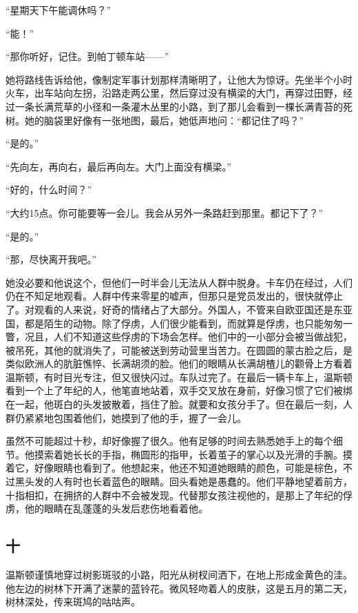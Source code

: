 ``星期天下午能调休吗？''

``能！''

``那你听好，记住。到帕丁顿车站------''

她将路线告诉给他，像制定军事计划那样清晰明了，让他大为惊讶。先坐半个小时火车，出车站向左拐，沿路走两公里，然后穿过没有横梁的大门，再穿过田野，经过一条长满荒草的小径和一条灌木丛里的小路，到了那儿会看到一棵长满青苔的死树。她的脑袋里好像有一张地图，最后，她低声地问：``都记住了吗？''

``是的。''

``先向左，再向右，最后再向左。大门上面没有横梁。''

``好的，什么时间？''

``大约15点。你可能要等一会儿。我会从另外一条路赶到那里。都记下了？''

``是的。''

``那，尽快离开我吧。''

她没必要和他说这个，但他们一时半会儿无法从人群中脱身。卡车仍在经过，人们仍在不知足地观看。人群中传来零星的嘘声，但那只是党员发出的，很快就停止了。对观看的人来说，好奇的情绪占了大部分。外国人，不管来自欧亚国还是东亚国，都是陌生的动物。除了俘虏，人们很少能看到，而就算是俘虏，也只能匆匆一瞥，况且，人们不知道这些俘虏的下场会怎样。他们中的一小部分会被当做战犯，被吊死，其他的就消失了，可能被送到劳动营里当苦力。在圆圆的蒙古脸之后，是类似欧洲人的肮脏憔悴、长满胡须的脸。他们的眼睛从长满胡楂儿的颧骨上方看着温斯顿，有时目光专注，但又很快闪过。车队过完了。在最后一辆卡车上，温斯顿看到一个上了年纪的人，他笔直地站着，双手交叉放在身前，好像习惯了它们被绑在一起，他斑白的头发披散着，挡住了脸。就要和女孩分手了。但在最后一刻，人群仍紧紧地包围着他们，她摸到了他的手，握了一会儿。

虽然不可能超过十秒，却好像握了很久。他有足够的时间去熟悉她手上的每个细节。他摸索着她长长的手指，椭圆形的指甲，长着茧子的掌心以及光滑的手腕。摸着它，好像眼睛也看到了。他想起来，他还不知道她眼睛的颜色，可能是棕色，不过黑头发的人有时也长着蓝色的眼睛。回头看她是愚蠢的。他们平静地望着前方，十指相扣，在拥挤的人群中不会被发现。代替那女孩注视他的，是那上了年纪的俘虏，他的眼睛在乱蓬蓬的头发后悲伤地看着他。

\subsection{十}\label{ux5341}

温斯顿谨慎地穿过树影斑驳的小路，阳光从树杈间洒下，在地上形成金黄色的洼。他左边的树林下开满了迷蒙的蓝铃花。微风轻吻着人的皮肤，这是五月的第二天，树林深处，传来斑鸠的咕咕声。

